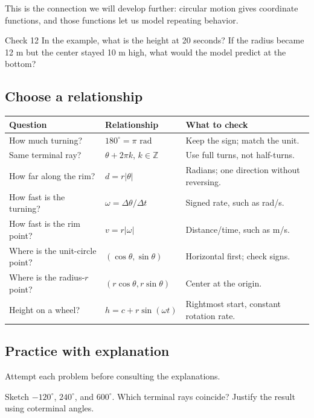 This is the connection we will develop further: circular motion gives coordinate functions, and those functions let us model repeating behavior.


\begin{monecheck}{Check 12}
In the example, what is the height at 20 seconds? If the radius became 12 m but the center stayed 10 m high, what would the model predict at the bottom?
\end{monecheck}

\clearpage
\subsection{Choose a relationship}

\begin{center}\small\renewcommand{\arraystretch}{1.35}\begin{tabularx}{\linewidth}{ZZZ}\toprule
\textbf{Question} & \textbf{Relationship} & \textbf{What to check} \\
\midrule
How much turning? & \(180^\circ=\pi\text{ rad}\) & Keep the sign; match the unit. \\
Same terminal ray? & \(\theta+2\pi k\), \(k\in\mathbb Z\) & Use full turns, not half-turns. \\
How far along the rim? & \(d=r|\theta|\) & Radians; one direction without reversing. \\
How fast is the turning? & \(\omega=\Delta\theta/\Delta t\) & Signed rate, such as rad/s. \\
How fast is the rim point? & \(v=r|\omega|\) & Distance/time, such as m/s. \\
Where is the unit-circle point? & \((\cos\theta,\sin\theta)\) & Horizontal first; check signs. \\
Where is the radius-\(r\) point? & \((r\cos\theta,r\sin\theta)\) & Center at the origin. \\
Height on a wheel? & \(h=c+r\sin(\omega t)\) & Rightmost start, constant rotation rate. \\
\bottomrule\end{tabularx}\end{center}

\subsection{Practice with explanation}
Attempt each problem before consulting the explanations.

\begin{practice}Sketch $-120^\circ$, $240^\circ$, and $600^\circ$.
Which terminal rays coincide? Justify the result using coterminal angles.\end{practice}


